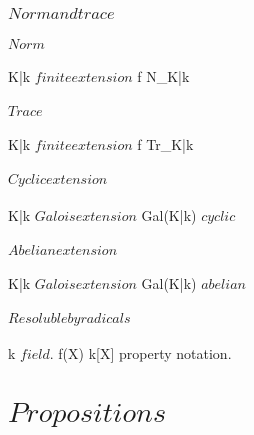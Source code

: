 \documentclass[a5paper]{book}
\begin{document}
\section{ $ Norm and trace $ }
{
	
	\subsection{ $ Norm $ }
	
	{
		K|k $ finite extension $
	}
	{
	}
	\denote
	{
		f \as N_{K|k}
	}


	\subsection{ $ Trace $ }
	
	{
		K|k $ finite extension $
	}
	{
	}
	\denote
	{
		f \as Tr_{K|k}
	}

	


	\subsection{ $ Cyclic extension $ }
	
	{
		K|k $ Galois extension $
	}
	{
		Gal(K|k) $ cyclic $
	}


	\subsection{ $ Abelian extension $ }
	
	{
		K|k $ Galois extension $
	}
	{
		Gal(K|k) $ abelian $
	}


	\subsection{ $ Resoluble by radicals $ }
	
	{
		k $ field $.
		f(X) \in k[X]
	}
	{
	}
	\denote
	{
		property \as notation.
	}
}




\part{ $ Propositions $ }
\end{document}
